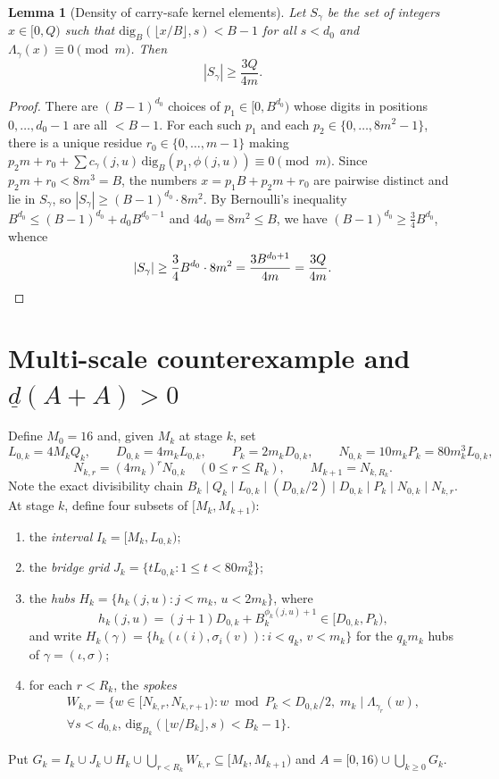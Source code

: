\documentclass[11pt,a4paper]{amsart}
\newtheorem{lemma}{Lemma}
\theoremstyle{remark}
\newcommand{\ld}{\underline{d}}
\begin{document}
\begin{lemma}[Density of carry-safe kernel elements]\label{lem:kernel}
Let $S_\gamma$ be the set of integers $x \in [0, Q)$ such that $\mathrm{dig}_B(\lfloor x / B \rfloor, s) < B - 1$ for all $s < d_0$ and $\Lambda_\gamma(x) \equiv 0 \pmod{m}$. Then
\[
|S_\gamma| \ge \frac{3 Q}{4 m}.
\]
\end{lemma}

\begin{proof}
There are $(B - 1)^{d_0}$ choices of $p_1 \in [0, B^{d_0})$ whose digits in positions $0, \dots, d_0 - 1$ are all $< B - 1$. For each such $p_1$ and each $p_2 \in \{0, \dots, 8 m^2 - 1\}$, there is a unique residue $r_0 \in \{0, \dots, m - 1\}$ making $p_2 m + r_0 + \sum c_\gamma(j, u)\, \mathrm{dig}_B(p_1, \phi(j, u)) \equiv 0 \pmod{m}$. Since $p_2 m + r_0 < 8 m^3 = B$, the numbers $x = p_1 B + p_2 m + r_0$ are pairwise distinct and lie in $S_\gamma$, so $|S_\gamma| \ge (B - 1)^{d_0} \cdot 8 m^2$. By Bernoulli's inequality $B^{d_0} \le (B - 1)^{d_0} + d_0 B^{d_0 - 1}$ and $4 d_0 = 8 m^2 \le B$, we have $(B - 1)^{d_0} \ge \frac{3}{4} B^{d_0}$, whence
\[
|S_\gamma| \ge \frac{3}{4} B^{d_0} \cdot 8 m^2 = \frac{3 B^{d_0 + 1}}{4 m} = \frac{3 Q}{4 m}. \qedhere
\]
\end{proof}

\section{\texorpdfstring{Multi-scale counterexample and $\ld(A + A) > 0$}{Multi-scale counterexample and d(A + A) > 0}}

Define $M_0 = 16$ and, given $M_k$ at stage $k$, set
\[
L_{0,k} = 4 M_k Q_k, \qquad D_{0,k} = 4 m_k L_{0,k}, \qquad P_k = 2 m_k D_{0,k}, \qquad N_{0,k} = 10 m_k P_k = 80 m_k^3 L_{0,k},
\]
\[
N_{k,r} = (4 m_k)^r N_{0,k} \quad (0 \le r \le R_k), \qquad M_{k+1} = N_{k, R_k}.
\]
Note the exact divisibility chain $B_k \mid Q_k \mid L_{0,k} \mid (D_{0,k}/2) \mid D_{0,k} \mid P_k \mid N_{0,k} \mid N_{k,r}$. At stage $k$, define four subsets of $[M_k, M_{k+1})$:
\begin{enumerate}
\item the \emph{interval} $I_k = [M_k, L_{0,k})$;
\item the \emph{bridge grid} $J_k = \{t L_{0,k} : 1 \le t < 80 m_k^3\}$;
\item the \emph{hubs} $H_k = \{h_k(j, u) : j < m_k,\, u < 2 m_k\}$, where
\[
h_k(j, u) = (j + 1) D_{0,k} + B_k^{\phi_k(j, u) + 1} \in [D_{0,k}, P_k),
\]
and write $H_k(\gamma) = \{h_k(\iota(i), \sigma_i(v)) : i < q_k,\, v < m_k\}$ for the $q_k m_k$ hubs of $\gamma = (\iota, \sigma)$;
\item for each $r < R_k$, the \emph{spokes}
\begin{multline*}
W_{k,r} = \bigl\{w \in [N_{k,r}, N_{k,r+1}) : w \bmod P_k < D_{0,k}/2,\; m_k \mid \Lambda_{\gamma_r}(w),\\
\forall s < d_{0,k},\, \mathrm{dig}_{B_k}(\lfloor w / B_k \rfloor, s) < B_k - 1\bigr\}.
\end{multline*}
\end{enumerate}
Put $G_k = I_k \cup J_k \cup H_k \cup \bigcup_{r < R_k} W_{k,r} \subseteq [M_k, M_{k+1})$ and $A = [0, 16) \cup \bigcup_{k \ge 0} G_k$.
\end{document}
